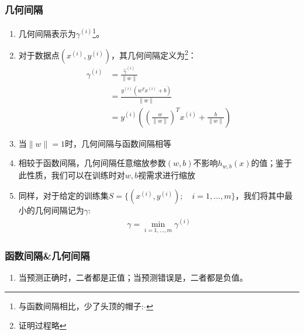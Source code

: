 \subsubsection{几何间隔}
\begin{enumerate}
	\item 几何间隔表示为$\gamma^{(i)}$\footnote{与函数间隔相比，少了头顶的帽子: $\hat{ }$}。
	\item 对于数据点$(x^{(i)}, y^{(i)})$，其几何间隔定义为\footnote{证明过程略}：
	\begin{align}
		\gamma^{(i)} &= \frac{\hat{\gamma}^{(i)}}{\|w\|}  \\
		&= \frac{y^{(i)}(w^Tx^{(i)} + b)}{\|w\|}  \\
		&=  y^{(i)} \left(\left(\frac{w}{\|w\|}\right)^T x^{(i)} + \frac{b}{\|w\|}\right)
	\end{align}
	\item 当$\|w\|=1$时，几何间隔与函数间隔相等
	\item 相较于函数间隔，几何间隔任意缩放参数$(w,b)$不影响$h_{w,b}(x)$的值；鉴于此性质，我们可以在训练时对$w, b$视需求进行缩放
	\item 同样，对于给定的训练集$S=\{(x^{(i)}, y^{(i)}); \quad i = 1, \dots, m\}$，我们将其中最小的几何间隔记为$\gamma$:
	\begin{align}
		\gamma = \min_{i=1,\dots,m}\gamma^{(i)}
	\end{align}
\end{enumerate}

\subsubsection{函数间隔\&几何间隔}
\begin{enumerate}
	\item 当预测正确时，二者都是正值；当预测错误是，二者都是负值。
\end{enumerate}

